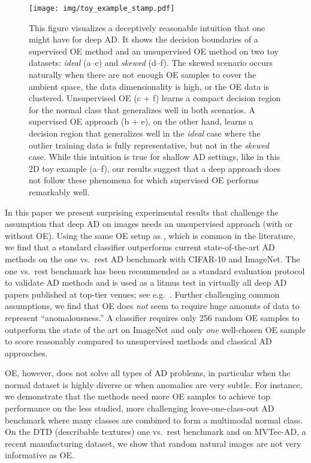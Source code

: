 \documentclass[10pt]{article} \usepackage[accepted]{stylefiles/tmlr}
\begin{document}
\begin{figure}[ht] \label{fig:toy_example}
  \begin{center}
    \texttt{[image: img/toy\_example\_stamp.pdf]}
  \end{center}
  \caption{
  This figure visualizes a deceptively reasonable intuition that one might have for deep AD. 
  It shows the decision boundaries of a supervised OE method and an unsupervised OE method on two toy datasets: \emph{ideal} (a--c) and \emph{skewed} (d--f). 
  The skewed scenario occurs naturally when there are not enough OE samples to cover the ambient space, the data dimensionality is high, or the OE data is clustered. 
  Unsupervised OE (c + f) learns a compact decision region for the normal class that generalizes well in both scenarios. 
  A supervised OE approach (b + e), on the other hand, learns a decision region that generalizes well in the \emph{ideal} case where the outlier training data is fully representative, but not in the \emph{skewed} case. 
  While this intuition is true for shallow AD settings, like in this 2D toy example (a--f), our results suggest that a deep approach does not follow these phenomena for which supervised OE performs remarkably well. }
\end{figure}


In this paper we present surprising experimental results that challenge the assumption that deep AD on images needs an unsupervised approach (with or without OE). 
Using the same OE setup as \citet{hendrycks2019using}, which is common in the literature, we find that a standard classifier outperforms current state-of-the-art AD methods on the one vs.~rest AD benchmark with CIFAR-10 and ImageNet. 
The one vs.~rest benchmark has been recommended as a standard evaluation protocol to validate AD methods \citep{emmott13} and is used as a litmus test in virtually all deep AD papers published at top-tier venues; see e.g.~\citep{ruff2018deep,deecke2018image,golan2018deep,samet19,hendrycks2019using,abati19,perera19,wang19,ruff2020,bergman20,kim20,liznerski2021, deecke2021transfer}. 
Further challenging common assumptions, we find that OE does \emph{not} seem to require huge amounts of data to represent ``anomalousness.'' 
A classifier requires only 256 random OE samples to outperform the state of the art on ImageNet and only \emph{one} well-chosen OE sample to score reasonably compared to unsupervised methods and classical AD approaches. 

OE, however, does not solve all types of AD problems, in particular when the normal dataset is highly diverse or when anomalies are very subtle.
For instance, we demonstrate that the methods need more OE samples to achieve top performance on the less studied, more challenging leave-one-class-out AD benchmark \cite{bergman20, ahmed2020, deecke2021transfer} where many classes are combined to form a multimodal normal class.
On the DTD (describable textures) one vs.~rest benchmark and on MVTec-AD, a recent manufacturing dataset, we show that random natural images are not very informative as OE.
\end{document}
